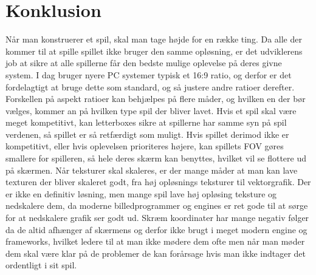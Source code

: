 \documentclass[main.tex]{Konklusion}
\begin{document}
\chapter{Konklusion}
Når man konstruerer et spil, skal man tage højde for en række ting. Da alle der kommer til at spille spillet ikke bruger den samme opløsning, er det udviklerens job at sikre at alle spillerne får den bedste mulige oplevelse på deres givne system.
I dag bruger nyere PC systemer typisk et 16:9 ratio, og derfor er det fordelagtigt at bruge dette som standard, og så justere andre ratioer derefter. Forskellen på aspekt ratioer kan behjælpes på flere måder, og hvilken en der bør vælges, kommer an på hvilken type spil der bliver lavet. Hvis et spil skal være meget kompetitivt, kan letterboxes sikre at spillerne har samme syn på spil verdenen, så spillet er så retfærdigt som muligt. Hvis spillet derimod ikke er kompetitivt, eller hvis oplevelsen prioriteres højere, kan spillets FOV gøres smallere for spilleren, så hele deres skærm kan benyttes, hvilket vil se flottere ud på skærmen. 
Når teksturer skal skaleres, er der mange måder at man kan lave texturen der bliver skaleret godt, fra høj opløsnings teksturer til vektorgrafik. Der er ikke en definitiv løsning, men mange spil lave høj opløsing teksture og nedskalere dem, da moderne billedprogrammer og engines er ret gode til at sørge for at nedskalere grafik ser godt ud.  
Skræm koordinater har mange negativ følger da de altid afhænger af skærmens  og  derfor ikke brugt i meget modern engine og frameworks, hvilket ledere til at man ikke mødere dem ofte men når man møder dem skal være klar på de problemer de kan forårsage hvis man ikke indtager det ordentligt i sit spil. 
\end{document}

